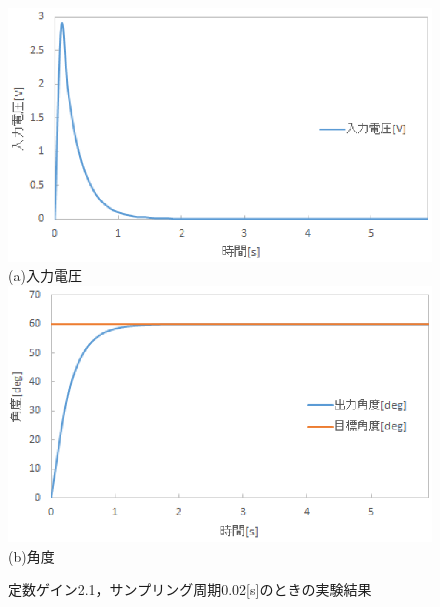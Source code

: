 \documentclass[11pt,a4paper]{jsarticle}
\begin{document}
\begin{figure}[H]
 \begin{center}
  \includegraphics[scale=.6]{./picture/graph7.eps} \\
  (a)入力電圧 \\
  \includegraphics[scale=.7]{./picture/graph8.eps} \\
  (b)角度
  \caption{定数ゲイン2.1，サンプリング周期0.02[s]のときの実験結果}
  \label{fig6}
 \end{center}
\end{figure}
\end{document}
